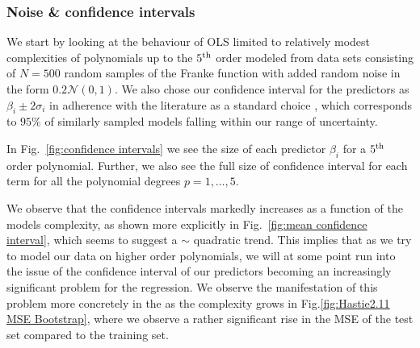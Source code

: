 \documentclass[reprint, english, nofootinbib]{revtex4-2}
\begin{document}
\subsubsection{Noise \& confidence intervals}

\noindent
We start by looking at the behaviour of OLS limited to relatively modest complexities of polynomials up to the $5^{\textup{th}}$ order modeled from data sets consisting of $N=500$ random samples of the Franke function with added random noise in the form $0.2\mathcal N(0, 1)$. We also chose our confidence interval for the predictors as $\beta_i\pm 2\sigma_i$ in adherence with the literature as a standard choice \cite{hastie}, which corresponds to $95\%$ of similarly sampled models falling within our range of uncertainty.

In Fig.~\ref{fig:confidence intervals} we see the size of each predictor $\beta_i$ for a $5^{\textup{th}}$ order polynomial. Further, we also see the full size of confidence interval for each term for all the polynomial degrees $p = 1,\dots, 5$.

We observe that the confidence intervals markedly increases as a function of the models complexity, as shown more explicitly in Fig.~\ref{fig:mean confidence interval}, which seems to suggest a $\sim$ quadratic trend. This implies that as we try to model our data on higher order polynomials, we will at some point run into the issue of the confidence interval of our predictors becoming an increasingly significant problem for the regression.
We observe the manifestation of this problem more concretely in the as the complexity grows in Fig.\ref{fig:Hastie2.11 MSE Bootstrap}, where we observe a rather significant rise in the MSE of the test set compared to the training set.
\end{document}
